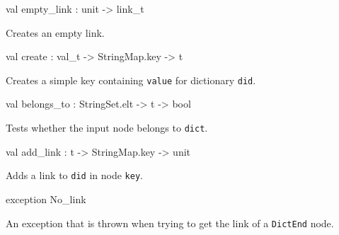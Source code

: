 \documentclass[11pt]{article}
\begin{document}
\label{val:Key.empty-underscorelink}\begin{ocamldoccode}
val empty_link : unit -> link_t
\end{ocamldoccode}
\begin{ocamldocdescription}
Creates an empty link.


\end{ocamldocdescription}




\label{val:Key.create}\begin{ocamldoccode}
val create : val_t -> StringMap.key -> t
\end{ocamldoccode}
\begin{ocamldocdescription}
Creates a simple key containing {\tt{value}} for dictionary {\tt{did}}.


\end{ocamldocdescription}




\label{val:Key.belongs-underscoreto}\begin{ocamldoccode}
val belongs_to : StringSet.elt -> t -> bool
\end{ocamldoccode}
\begin{ocamldocdescription}
Tests whether the input node belongs to {\tt{dict}}.


\end{ocamldocdescription}




\label{val:Key.add-underscorelink}\begin{ocamldoccode}
val add_link : t -> StringMap.key -> unit
\end{ocamldoccode}
\begin{ocamldocdescription}
Adds a link to {\tt{did}} in node {\tt{key}}.


\end{ocamldocdescription}




\label{exception:Key.No-underscorelink}\begin{ocamldoccode}
exception No_link
\end{ocamldoccode}
\begin{ocamldocdescription}
An exception that is thrown when trying to get the link of a
    {\tt{DictEnd}} node.


\end{ocamldocdescription}
\end{document}
